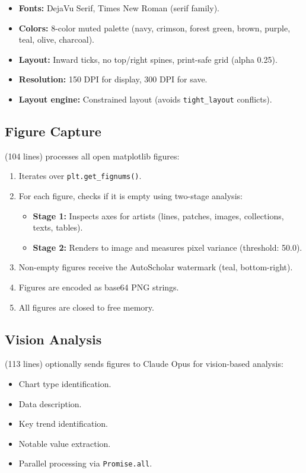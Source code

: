 \begin{itemize}
  \item \textbf{Fonts:} DejaVu Serif, Times New Roman (serif family).
  \item \textbf{Colors:} 8-color muted palette (navy, crimson, forest green, brown, purple, teal, olive, charcoal).
  \item \textbf{Layout:} Inward ticks, no top/right spines, print-safe grid (alpha 0.25).
  \item \textbf{Resolution:} 150 DPI for display, 300 DPI for save.
  \item \textbf{Layout engine:} Constrained layout (avoids \texttt{tight\_layout} conflicts).
\end{itemize}

\subsection{Figure Capture}

 (104 lines) processes all open matplotlib figures:

\begin{enumerate}
  \item Iterates over \texttt{plt.get\_fignums()}.
  \item For each figure, checks if it is empty using two-stage analysis:
  \begin{itemize}
    \item \textbf{Stage 1:} Inspects axes for artists (lines, patches, images, collections, texts, tables).
    \item \textbf{Stage 2:} Renders to image and measures pixel variance (threshold: 50.0).
  \end{itemize}
  \item Non-empty figures receive the AutoScholar watermark (teal, bottom-right).
  \item Figures are encoded as base64 PNG strings.
  \item All figures are closed to free memory.
\end{enumerate}

\subsection{Vision Analysis}

 (113 lines) optionally sends figures to Claude Opus for vision-based analysis:

\begin{itemize}
  \item Chart type identification.
  \item Data description.
  \item Key trend identification.
  \item Notable value extraction.
  \item Parallel processing via \texttt{Promise.all}.
\end{itemize}


